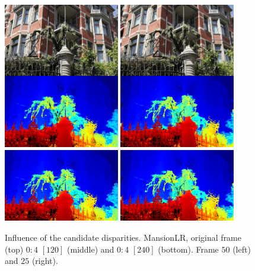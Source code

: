 \documentclass{article}
\theoremstyle{definition}
\begin{document}
\begin{figure}[ht]
 \centering
 \includegraphics[width=0.45\textwidth]{images/MansionLR_120/1521751973001_dmap_050.png}\hspace{1em}
 \includegraphics[width=0.45\textwidth]{images/MansionLR_120/1521751973001_dmap_025.png}\\
 \vspace{-0.1em}
 \includegraphics[width=0.45\textwidth]{images/MansionLR_240/1521776307225_dmap_050.png}\hspace{1em}
 \includegraphics[width=0.45\textwidth]{images/MansionLR_240/1521776307225_dmap_025.png}
 \caption{Influence of the candidate disparities. MansionLR, original frame (top) $0:4$ $[120]$ (middle) and $0:4$ $[240]$ (bottom). Frame $50$ (left) and $25$ (right).}
 \label{fig:mansionlr:candidated}
\end{figure}
\end{document}
